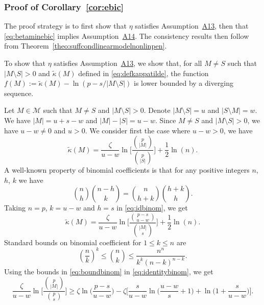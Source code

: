 \documentclass[bj,authoryear]{imsart}
\theoremstyle{plain}
\newcommand{\M}{\mathcal{M}}
\begin{document}
\subsubsection{Proof of Corollary~\ref{cor:ebic}}
The proof strategy is to first show that $\eta$ satisfies Assumption~\hyperlink{lab:A13}{A13}, then that \eqref{eq:betaminebic} implies Assumption~\hyperlink{lab:A14}{A14}. The consistency results then follow from Theorem~\ref{theo:suffcondlinearmodelnonlinpen}.

To show that $\eta$ satisfies Assumption~\hyperlink{lab:A13}{A13}, we show that, for all $M\neq S$ such that $|M\setminus S|>0$ and $\tilde{\kappa}(M)$ defined in \eqref{eq:defkappatilde}, the function $f(M):=\tilde{\kappa}(M)-\ln(p-s/|M\setminus S|)$ is lower bounded by a diverging sequence. 

Let $M\in\M$ such that $M\neq S$ and $|M\setminus S|>0$. Denote $|M\setminus S|=u$ and $|S\setminus M|=w$. We have $|M|=u+s-w$ and $|M|-|S|=u-w$. Since $M\neq S$ and $|M\setminus S|>0$, we have $u- w\neq0$ and $u>0$. We consider first the case where $u-w>0$, we have
    \begin{equation*}
        \tilde{\kappa}(M)=\frac{\zeta}{u-w}\ln\Bigg[\frac{\binom{p}{|M|}}{\binom{p}{|S|}}\Bigg]+ \frac{1}{2}\ln(n).
    \end{equation*}
    A well-known property of binomial coefficients is that for any positive integers $n$, $h$, $k$ we have
    \begin{equation}\label{eq:idbinom}
        \binom{n}{h}\binom{n-h}{k}=\binom{n}{h+k}\binom{h+k}{h}.
    \end{equation}
    Taking $n=p$, $k=u-w$ and $h=s$ in \eqref{eq:idbinom}, we get
    \begin{equation}\label{eq:identitybinom}
        \tilde{\kappa}(M)=\frac{\zeta}{u-w}\ln\bigg[\frac{\binom{p -s}{u-w}}{\binom{|M|}{s}}\bigg]+ \frac{1}{2}\ln(n).
    \end{equation}
Standard bounds on binomial coefficient for $1\leq k\leq n$ are
\begin{equation}\label{eq:boundbinom}
  \left(\frac{n}{k}\right)^k \leq  \binom{n}{k} \leq \frac{n^n}{k^k(n-k)^{n-k}}.
\end{equation}
Using the bounds in \eqref{eq:boundbinom} in \eqref{eq:identitybinom}, we get
\begin{equation}\label{eq:gggg}
    \frac{\zeta}{u-w}\ln\bigg[\frac{\binom{p}{|M|}}{\binom{p}{s}}\bigg] \geq \zeta\ln\bigg(\frac{p-s}{u-w}\bigg)-\zeta\bigg[\frac{s}{u-w}\ln\bigg(\frac{u-w}{s}+1\bigg) +\ln\bigg(1+\frac{s}{u-w}\bigg) \bigg].
\end{equation}
\end{document}
